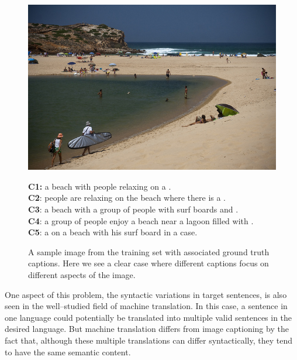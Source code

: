 \begin{figure}[h]
    \begin{minipage}[c]{0.45\linewidth}
            \includegraphics[width=\textwidth]{images/COCO_train2014_000000440903.jpg}
    \end{minipage}\hfill
    \begin{minipage}[c]{0.52\linewidth}
            \textbf{C1:} a beach with people relaxing on a . \\
            \textbf{C2}: people are relaxing on the beach where there is a . \\
            \textbf{C3}: a beach with a group of people with surf boards and . \\
            \textbf{C4}: a group of people enjoy a beach near a lagoon filled with . \\
            \textbf{C5}: a  on a beach with his surf board in a case. \\
    \end{minipage}
  \vspace*{-3mm}
  \caption{ A sample image from the training set with associated ground truth
  captions. Here we see a clear case where different captions focus on different
  aspects of the image.
  }
  \label{fig_capdiversity}
\end{figure}

One aspect of this problem, the syntactic variations in target sentences, is also
seen in the well--studied field of machine translation.
In this case, a sentence in one language could potentially be translated into
multiple valid sentences in the desired language.
But machine translation differs from image captioning by the fact that, although
these multiple translations can differ syntactically, they tend to have the same
semantic content.

